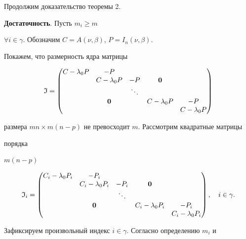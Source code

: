  


Продолжим доказательство теоремы 2.





{\bf Достаточность}. Пусть $m_i\ge m$ 


$\forall i\in\gamma$. Обозначим $C=A(\nu,\beta)$, $P=I_n(\nu,\beta)$. 


Покажем, что размерность ядра матрицы 


$$ 


\frak I= 


\begin{pmatrix} 


C-\lambda_0P & -P & \ & \ & \ \\ 


\ & C-\lambda_0P & -P & \bold 0 & \ \\ 


\ & \ & \ddots & \ & \ \\ 


\ & \bold 0 & \ & C-\lambda_0P & -P \\ 


\ & \ & \ & \ & C-\lambda_0P 


\end{pmatrix} 


$$ 


размера $mn\times m(n-p)$ не превосходит $m$. Рассмотрим квадратные матрицы 


порядка 


$m(n-p)$ 


$$ 


\frak I_i= 


\begin{pmatrix} 


C_i-\lambda_0P_i & -P_i & \ & \ & \ \\ 


\ & C_i-\lambda_0P_i & -P_i & \bold 0 & \ \\ 


\ & \ & \ddots & \ & \ \\ 


\ & \bold 0 & \ & C_i-\lambda_0P_i & -P_i \\ 


\ & \ & \ & \ & C_i-\lambda_0P_i 


\end{pmatrix} 


,\quad i\in \gamma. 


$$ 


Зафиксируем произвольный индекс $i\in\gamma$. Согласно определению $m_i$ и 


